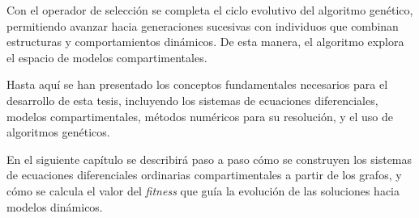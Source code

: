 Con el operador de selección se completa el ciclo evolutivo del algoritmo genético, permitiendo avanzar hacia generaciones sucesivas con individuos que combinan 
estructuras y comportamientos dinámicos. De esta manera, el algoritmo explora el espacio de modelos compartimentales.

Hasta aquí se han presentado los conceptos fundamentales necesarios para el desarrollo de esta tesis, incluyendo los sistemas de ecuaciones diferenciales, 
modelos compartimentales, métodos numéricos para su resolución, y el uso de algoritmos genéticos.

En el siguiente capítulo se describirá paso a paso cómo se construyen los sistemas de ecuaciones
diferenciales ordinarias compartimentales a partir de los grafos, y cómo se calcula el valor del \textit{fitness} que guía la evolución de las soluciones hacia modelos dinámicos.
